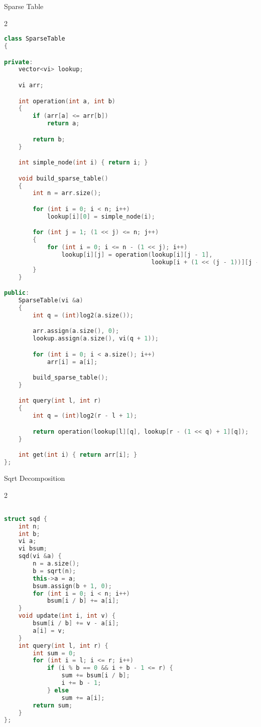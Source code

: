 \documentclass[leter]{amsart}
\begin{document}
Sparse Table
\begin{multicols}{2}
\begin{lstlisting}[language=C++]
class SparseTable
{

private:
    vector<vi> lookup;

    vi arr;

    int operation(int a, int b)
    {
        if (arr[a] <= arr[b])
            return a;

        return b;
    }

    int simple_node(int i) { return i; }

    void build_sparse_table()
    {
        int n = arr.size();

        for (int i = 0; i < n; i++)
            lookup[i][0] = simple_node(i);

        for (int j = 1; (1 << j) <= n; j++)
        {
            for (int i = 0; i <= n - (1 << j); i++)
                lookup[i][j] = operation(lookup[i][j - 1],
                                         lookup[i + (1 << (j - 1))][j - 1]);
        }
    }

public:
    SparseTable(vi &a)
    {
        int q = (int)log2(a.size());

        arr.assign(a.size(), 0);
        lookup.assign(a.size(), vi(q + 1));

        for (int i = 0; i < a.size(); i++)
            arr[i] = a[i];

        build_sparse_table();
    }

    int query(int l, int r)
    {
        int q = (int)log2(r - l + 1);

        return operation(lookup[l][q], lookup[r - (1 << q) + 1][q]);
    }

    int get(int i) { return arr[i]; }
};

\end{lstlisting}
\end{multicols}
Sqrt Decomposition
\begin{multicols}{2}
\begin{lstlisting}[language=C++]

struct sqd {
    int n;
    int b;
    vi a;
    vi bsum;
    sqd(vi &a) {
        n = a.size();
        b = sqrt(n);
        this->a = a;
        bsum.assign(b + 1, 0);
        for (int i = 0; i < n; i++)
            bsum[i / b] += a[i];
    }
    void update(int i, int v) {
        bsum[i / b] += v - a[i];
        a[i] = v;
    }
    int query(int l, int r) {
        int sum = 0;
        for (int i = l; i <= r; i++)
            if (i % b == 0 && i + b - 1 <= r) {
                sum += bsum[i / b];
                i += b - 1;
            } else
                sum += a[i];
        return sum;
    }
};


\end{lstlisting}
\end{multicols}
\end{document}
